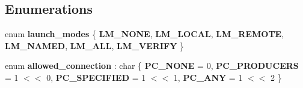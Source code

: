 \subsection*{Enumerations}
\begin{DoxyCompactItemize}
\item 
\mbox{\label{programs_2aacio-launcher_2main_8cpp_a759690ed22a7306147759efee4b4545c}} 
enum {\bfseries launch\+\_\+modes} \{ \newline
{\bfseries L\+M\+\_\+\+N\+O\+NE}, 
{\bfseries L\+M\+\_\+\+L\+O\+C\+AL}, 
{\bfseries L\+M\+\_\+\+R\+E\+M\+O\+TE}, 
{\bfseries L\+M\+\_\+\+N\+A\+M\+ED}, 
\newline
{\bfseries L\+M\+\_\+\+A\+LL}, 
{\bfseries L\+M\+\_\+\+V\+E\+R\+I\+FY}
 \}
\item 
\mbox{\label{programs_2aacio-launcher_2main_8cpp_ab01c8de587c7ad64f990fcfaf8c7d1f7}} 
enum {\bfseries allowed\+\_\+connection} \+: char \{ {\bfseries P\+C\+\_\+\+N\+O\+NE} = 0, 
{\bfseries P\+C\+\_\+\+P\+R\+O\+D\+U\+C\+E\+RS} = 1 $<$$<$ 0, 
{\bfseries P\+C\+\_\+\+S\+P\+E\+C\+I\+F\+I\+ED} = 1 $<$$<$ 1, 
{\bfseries P\+C\+\_\+\+A\+NY} = 1 $<$$<$ 2
 \}
\end{DoxyCompactItemize}
